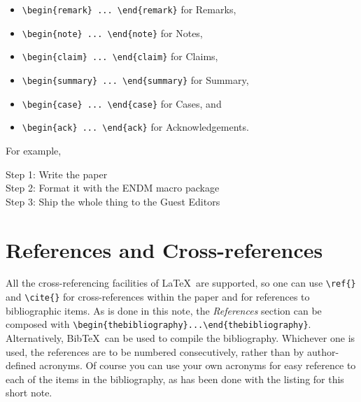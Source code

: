 \documentclass{endm}
\begin{document}
\begin{itemize}
\item \verb+\begin{remark} ... \end{remark}+ for Remarks,
\item \verb+\begin{note} ... \end{note}+ for Notes,
\item \verb+\begin{claim} ... \end{claim}+ for Claims,
\item \verb+\begin{summary} ... \end{summary}+ for Summary,
\item \verb+\begin{case} ... \end{case}+ for Cases, and
\item \verb+\begin{ack} ... \end{ack}+ for Acknowledgements.
\end{itemize}

For example,

\begin{algorithm}[h]
\begin{alg}
Step 1: Write the paper\\
Step 2: Format it with the ENDM macro package\\
Step 3: Ship the whole thing to the Guest Editors\\
\end{alg}
\end{algorithm}


\section{References and Cross-references}

All the cross-referencing facilities of \LaTeX\ are supported, so one
can use \verb+\ref{}+ and \verb+\cite{}+ for cross-references within
the paper and for references to bibliographic items. As is done in this
note, the \emph{References} section can be composed with
\verb+\begin{thebibliography}...\end{thebibliography}+. Alternatively,
Bib\TeX\ can be used to compile the bibliography. Whichever one is used,
the references are to be numbered consecutively, rather than by
author-defined acronyms. Of course you can use your own acronyms for
easy reference to each of the items in the bibliography, as has been
done with the listing for this short note.
\end{document}
